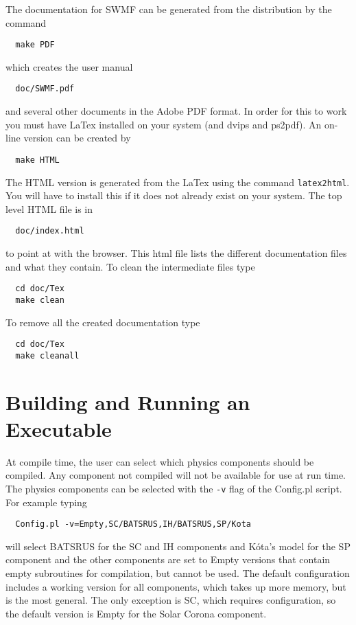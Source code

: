 The documentation for SWMF can be generated from the distribution by
the command
\begin{verbatim}
  make PDF
\end{verbatim}
which creates the user manual
\begin{verbatim}
  doc/SWMF.pdf
\end{verbatim}
and several other documents in the Adobe PDF format.  
In order for this to work you must have
LaTex installed on your system (and dvips and ps2pdf).  
An on-line version can be created by
\begin{verbatim}
  make HTML
\end{verbatim}
The HTML version is generated from the LaTex using the command 
{\tt latex2html}.
You will have to install this if it does not already exist on your system.
The top level HTML file is in
\begin{verbatim}
  doc/index.html
\end{verbatim}
to point at with the browser.  This html file lists the different
documentation files and what they contain.  
To clean the intermediate files type
\begin{verbatim}
  cd doc/Tex
  make clean
\end{verbatim}
To remove all the created documentation type
\begin{verbatim}
  cd doc/Tex
  make cleanall
\end{verbatim}

\section{Building and Running an Executable}

At compile time, the user can select which physics components should be
compiled.  
Any component not compiled will not be available for
use at run time.  The physics components can be selected with the {\tt -v} flag
of the Config.pl script. For example typing
\begin{verbatim}
  Config.pl -v=Empty,SC/BATSRUS,IH/BATSRUS,SP/Kota
\end{verbatim}
will select BATSRUS for the SC and IH components and K\'ota's model for
the SP component and the other components are set to Empty versions
that contain empty subroutines for compilation, but cannot be used.
The default configuration includes a working version for all components, 
which takes up more memory, but is the most general.
The only exception is SC, which requires configuration, so the 
default version is Empty for the Solar Corona component.

